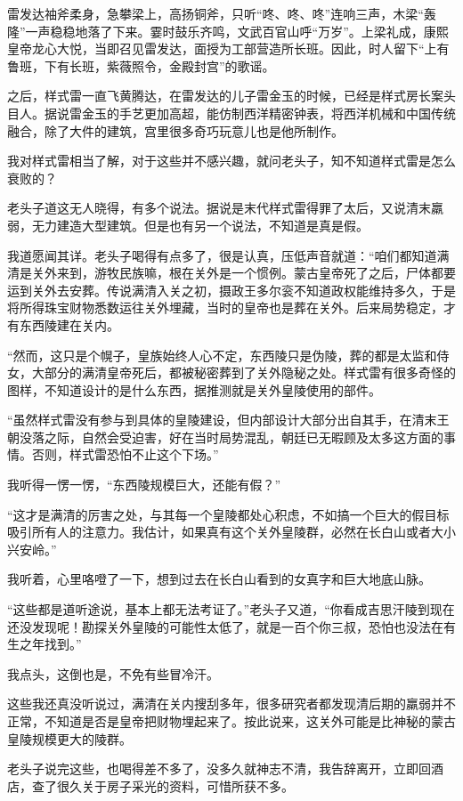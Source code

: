 雷发达袖斧柔身，急攀梁上，高扬铜斧，只听“咚、咚、咚”连响三声，木梁“轰隆”一声稳稳地落了下来。霎时鼓乐齐鸣，文武百官山呼“万岁”。上梁礼成，康熙皇帝龙心大悦，当即召见雷发达，面授为工部营造所长班。因此，时人留下“上有鲁班，下有长班，紫薇照令，金殿封宫”的歌谣。

之后，样式雷一直飞黄腾达，在雷发达的儿子雷金玉的时候，已经是样式房长案头目人。据说雷金玉的手艺更加高超，能仿制西洋精密钟表，将西洋机械和中国传统融合，除了大件的建筑，宫里很多奇巧玩意儿也是他所制作。

我对样式雷相当了解，对于这些并不感兴趣，就问老头子，知不知道样式雷是怎么衰败的？

老头子道这无人晓得，有多个说法。据说是末代样式雷得罪了太后，又说清末羸弱，无力建造大型建筑。但是也有另一个说法，不知道是真是假。

我道愿闻其详。老头子喝得有点多了，很是认真，压低声音就道：“咱们都知道满清是关外来到，游牧民族嘛，根在关外是一个惯例。蒙古皇帝死了之后，尸体都要运到关外去安葬。传说满清入关之初，摄政王多尔衮不知道政权能维持多久，于是将所得珠宝财物悉数运往关外埋藏，当时的皇帝也是葬在关外。后来局势稳定，才有东西陵建在关内。

“然而，这只是个幌子，皇族始终人心不定，东西陵只是伪陵，葬的都是太监和侍女，大部分的满清皇帝死后，都被秘密葬到了关外隐秘之处。样式雷有很多奇怪的图样，不知道设计的是什么东西，据推测就是关外皇陵使用的部件。

“虽然样式雷没有参与到具体的皇陵建设，但内部设计大部分出自其手，在清末王朝没落之际，自然会受迫害，好在当时局势混乱，朝廷已无暇顾及太多这方面的事情。否则，样式雷恐怕不止这个下场。”

我听得一愣一愣，“东西陵规模巨大，还能有假？”

“这才是满清的厉害之处，与其每一个皇陵都处心积虑，不如搞一个巨大的假目标吸引所有人的注意力。我估计，如果真有这个关外皇陵群，必然在长白山或者大小兴安岭。”

我听着，心里咯噔了一下，想到过去在长白山看到的女真字和巨大地底山脉。

“这些都是道听途说，基本上都无法考证了。”老头子又道，“你看成吉思汗陵到现在还没发现呢！勘探关外皇陵的可能性太低了，就是一百个你三叔，恐怕也没法在有生之年找到。”

我点头，这倒也是，不免有些冒冷汗。

这些我还真没听说过，满清在关内搜刮多年，很多研究者都发现清后期的羸弱并不正常，不知道是否是皇帝把财物埋起来了。按此说来，这关外可能是比神秘的蒙古皇陵规模更大的陵群。

老头子说完这些，也喝得差不多了，没多久就神志不清，我告辞离开，立即回酒店，查了很久关于房子采光的资料，可惜所获不多。

